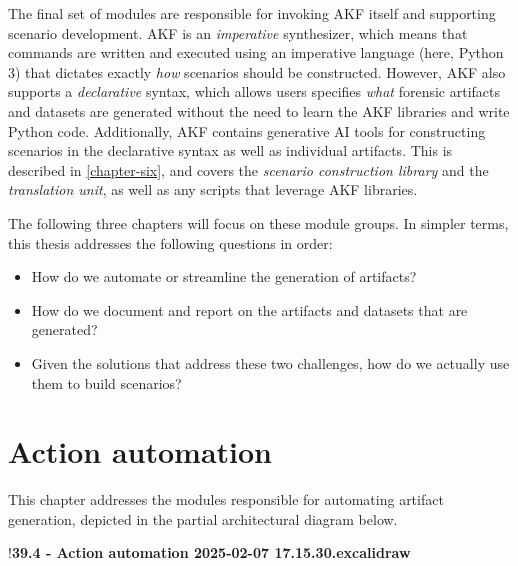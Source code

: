 \documentclass[letterpaper,12pt]{report}
\def\tightlist{}
\begin{document}
The final set of modules are responsible for invoking AKF itself and
supporting scenario development. AKF is an \emph{imperative}
synthesizer, which means that commands are written and executed using an
imperative language (here, Python 3) that dictates exactly \emph{how}
scenarios should be constructed. However, AKF also supports a
\emph{declarative} syntax, which allows users specifies \emph{what}
forensic artifacts and datasets are generated without the need to learn
the AKF libraries and write Python code. Additionally, AKF contains
generative AI tools for constructing scenarios in the declarative syntax
as well as individual artifacts. This is described in \autoref{chapter-six}, and covers the \emph{scenario construction library}
and the \emph{translation unit}, as well as any scripts that leverage
AKF libraries.

The following three chapters will focus on these module groups. In
simpler terms, this thesis addresses the following questions in order:

\begin{itemize}
\tightlist
\item
  How do we automate or streamline the generation of artifacts?
\item
  How do we document and report on the artifacts and datasets that are
  generated?
\item
  Given the solutions that address these two challenges, how do we
  actually use them to build scenarios?
\end{itemize}

\chapter{Action automation}\label{chapter-four}

This chapter addresses the modules responsible for automating artifact
generation, depicted in the partial architectural diagram below.

!\textbf{39.4 - Action automation 2025-02-07 17.15.30.excalidraw}
\end{document}
